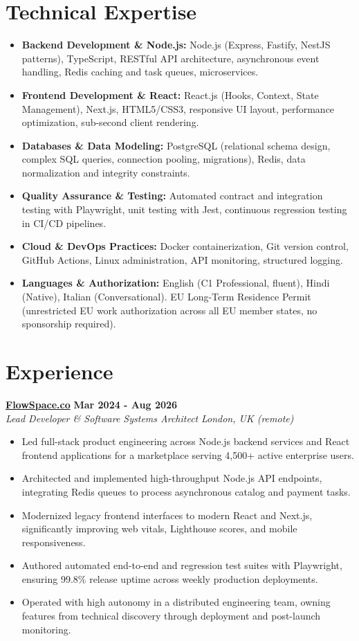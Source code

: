 \documentclass[10pt,a4paper]{article}
\newcommand{\role}[4]{%
  \textbf{#1} \hfill \textbf{#2}\\[1pt]%
  \textit{#3} \hfill \textit{#4}\\[2pt]%
}
\begin{document}
\section{Technical Expertise}
\begin{itemize}
  \item \textbf{Backend Development \& Node.js:} Node.js (Express, Fastify, NestJS patterns), TypeScript, RESTful API architecture, asynchronous event handling, Redis caching and task queues, microservices.
  \item \textbf{Frontend Development \& React:} React.js (Hooks, Context, State Management), Next.js, HTML5/CSS3, responsive UI layout, performance optimization, sub-second client rendering.
  \item \textbf{Databases \& Data Modeling:} PostgreSQL (relational schema design, complex SQL queries, connection pooling, migrations), Redis, data normalization and integrity constraints.
  \item \textbf{Quality Assurance \& Testing:} Automated contract and integration testing with Playwright, unit testing with Jest, continuous regression testing in CI/CD pipelines.
  \item \textbf{Cloud \& DevOps Practices:} Docker containerization, Git version control, GitHub Actions, Linux administration, API monitoring, structured logging.
  \item \textbf{Languages \& Authorization:} English (C1 Professional, fluent), Hindi (Native), Italian (Conversational). EU Long-Term Residence Permit (unrestricted EU work authorization across all EU member states, no sponsorship required).
\end{itemize}

\section{Experience}

\role{\href{https://flowspace.co}{FlowSpace.co}}{Mar 2024 - Aug 2026}{Lead Developer \& Software Systems Architect}{London, UK (remote)}
\begin{itemize}
  \item Led full-stack product engineering across Node.js backend services and React frontend applications for a marketplace serving 4,500+ active enterprise users.
  \item Architected and implemented high-throughput Node.js API endpoints, integrating Redis queues to process asynchronous catalog and payment tasks.
  \item Modernized legacy frontend interfaces to modern React and Next.js, significantly improving web vitals, Lighthouse scores, and mobile responsiveness.
  \item Authored automated end-to-end and regression test suites with Playwright, ensuring 99.8\% release uptime across weekly production deployments.
  \item Operated with high autonomy in a distributed engineering team, owning features from technical discovery through deployment and post-launch monitoring.
\end{itemize}
\end{document}
